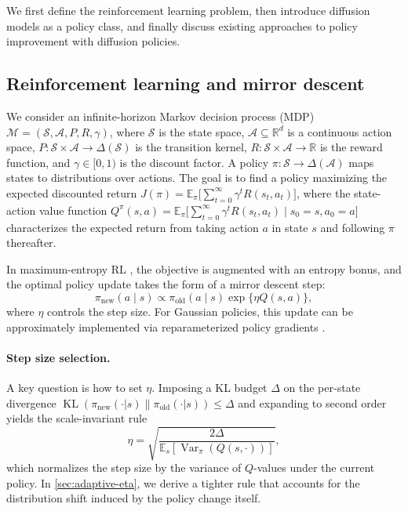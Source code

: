 \documentclass{article}
\theoremstyle{plain}
\theoremstyle{definition}
\theoremstyle{remark}
\newcommand{\E}{\mathbb{E}}
\DeclareMathOperator{\KL}{KL}
\DeclareMathOperator{\Var}{Var}
\begin{document}
We first define the reinforcement learning problem, then introduce diffusion models as a policy class, and finally discuss existing approaches to policy improvement with diffusion policies.

\subsection{Reinforcement learning and mirror descent}
\label{sec:rl-background}

We consider an infinite-horizon Markov decision process (MDP) $\mathcal{M} = (\mathcal{S}, \mathcal{A}, P, R, \gamma)$, where $\mathcal{S}$ is the state space, $\mathcal{A} \subseteq \mathbb{R}^d$ is a continuous action space, $P: \mathcal{S} \times \mathcal{A} \to \Delta(\mathcal{S})$ is the transition kernel, $R: \mathcal{S} \times \mathcal{A} \to \mathbb{R}$ is the reward function, and $\gamma \in [0,1)$ is the discount factor.
A policy $\pi: \mathcal{S} \to \Delta(\mathcal{A})$ maps states to distributions over actions.
The goal is to find a policy maximizing the expected discounted return $J(\pi) = \E_\pi\bigl[\sum_{t=0}^\infty \gamma^t R(s_t, a_t)\bigr]$, where the state-action value function $Q^\pi(s,a) = \E_\pi\bigl[\sum_{t=0}^\infty \gamma^t R(s_t,a_t) \mid s_0=s, a_0=a\bigr]$ characterizes the expected return from taking action $a$ in state $s$ and following $\pi$ thereafter.

In maximum-entropy RL \citep{haarnoja2018sac}, the objective is augmented with an entropy bonus, and the optimal policy update takes the form of a mirror descent step:
\begin{equation}
  \pi_{\mathrm{new}}(a\mid s) \propto \pi_\mathrm{old}(a\mid s) \exp\{\eta Q(s,a)\},
  \label{eq:md-tilt}
\end{equation}
where $\eta$ controls the step size.
For Gaussian policies, this update can be approximately implemented via reparameterized policy gradients \citep{haarnoja2018sac}.

\paragraph{Step size selection.}
A key question is how to set $\eta$.
Imposing a KL budget $\Delta$ on the per-state divergence $\KL(\pi_{\mathrm{new}}(\cdot|s) \| \pi_{\mathrm{old}}(\cdot|s)) \le \Delta$ and expanding to second order yields the scale-invariant rule
\begin{equation}
  \eta = \sqrt{\frac{2\Delta}{\E_{s}[\Var_{\pi}(Q(s,\cdot))]}},
  \label{eq:kl-budget-eta}
\end{equation}
which normalizes the step size by the variance of $Q$-values under the current policy.
In \cref{sec:adaptive-eta}, we derive a tighter rule that accounts for the distribution shift induced by the policy change itself.
\end{document}
